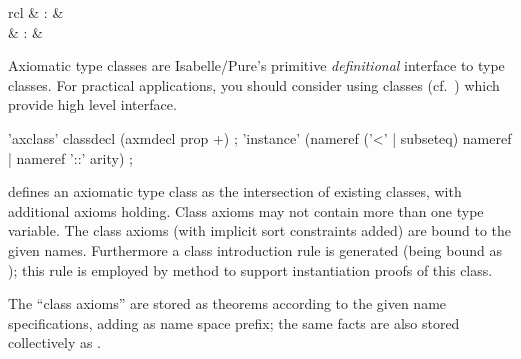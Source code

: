 \begin{isabellebody}
\begin{isamarkuptext}
\begin{itemize}
  \end{itemize}%
\end{isamarkuptext}%
\isamarkuptrue%
%
\isamarkuptrue%
%
\begin{isamarkuptext}%
\begin{matharray}{rcl}
    \hypertarget{command.axclass}{\hyperlink{command.axclass}{\mbox{}}} & : &  \\
    \hypertarget{command.instance}{\hyperlink{command.instance}{\mbox{}}} & : &  \\
  \end{matharray}

  Axiomatic type classes are Isabelle/Pure's primitive
  \emph{definitional} interface to type classes.  For practical
  applications, you should consider using classes
  (cf.~) which provide high level interface.

  \begin{rail}
    'axclass' classdecl (axmdecl prop +)
    ;
    'instance' (nameref ('<' | subseteq) nameref | nameref '::' arity)
    ;
  \end{rail}

  \begin{descr}
  
  \item [\hyperlink{command.axclass}{\mbox{\isa{\isacommand{axclass}}}}~\isa{{\isachardoublequote}c\ {\isasymsubseteq}\ c\isactrlsub {\isadigit{1}}{\isacharcomma}\ {\isasymdots}{\isacharcomma}\ c\isactrlsub n\ axms{\isachardoublequote}}] defines an axiomatic type class as the intersection of
  existing classes, with additional axioms holding.  Class axioms may
  not contain more than one type variable.  The class axioms (with
  implicit sort constraints added) are bound to the given names.
  Furthermore a class introduction rule is generated (being bound as
  ); this rule is employed by method \hyperlink{method.intro_classes}{\mbox{}} to support instantiation proofs of this class.
  
  The ``class axioms'' are stored as theorems according to the given
  name specifications, adding  as name space prefix;
  the same facts are also stored collectively as .
  

\end{descr}
\end{isamarkuptext}
\end{isabellebody}
